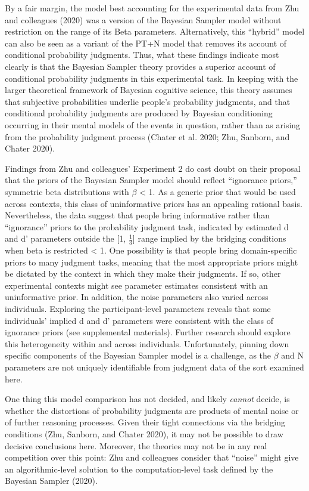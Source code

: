 \documentclass{article}
\begin{document}
By a fair margin, the model best accounting for the experimental data
from Zhu and colleagues (2020) was a version of the Bayesian Sampler
model without restriction on the range of its Beta parameters.
Alternatively, this ``hybrid'' model can also be seen as a variant of
the PT+N model that removes its account of conditional probability
judgments. Thus, what these findings indicate most clearly is that the
Bayesian Sampler theory provides a superior account of conditional
probability judgments in this experimental task. In keeping with the
larger theoretical framework of Bayesian cognitive science, this theory
assumes that subjective probabilities underlie people's probability
judgments, and that conditional probability judgments are produced by
Bayesian conditioning occurring in their mental models of the events in
question, rather than as arising from the probability judgment process
(Chater et al. 2020; Zhu, Sanborn, and Chater 2020).

Findings from Zhu and colleagues' Experiment 2 do cast doubt on their
proposal that the priors of the Bayesian Sampler model should reflect
``ignorance priors,'' symmetric beta distributions with \(\beta\)
\textless{} 1. As a generic prior that would be used across contexts,
this class of uninformative priors has an appealing rational basis.
Nevertheless, the data suggest that people bring informative rather than
``ignorance'' priors to the probability judgment task, indicated by
estimated d and d' parameters outside the {[}1, \(\frac{1}{3}\){]} range
implied by the bridging conditions when beta is restricted \textless{}
1. One possibility is that people bring domain-specific priors to many
judgment tasks, meaning that the most appropriate priors might be
dictated by the context in which they make their judgments. If so, other
experimental contexts might see parameter estimates consistent with an
uninformative prior. In addition, the noise parameters also varied
across individuals. Exploring the participant-level parameters reveals
that some individuals' implied d and d' parameters were consistent with
the class of ignorance priors (see supplemental materials). Further
research should explore this heterogeneity within and across
individuals. Unfortunately, pinning down specific components of the
Bayesian Sampler model is a challenge, as the \(\beta\) and N parameters
are not uniquely identifiable from judgment data of the sort examined
here.

One thing this model comparison has not decided, and likely
\emph{cannot} decide, is whether the distortions of probability
judgments are products of mental noise or of further reasoning
processes. Given their tight connections via the bridging conditions
(Zhu, Sanborn, and Chater 2020), it may not be possible to draw decisive
conclusions here. Moreover, the theories may not be in any real
competition over this point: Zhu and colleagues consider that ``noise''
might give an algorithmic-level solution to the computation-level task
defined by the Bayesian Sampler (2020).
\end{document}
